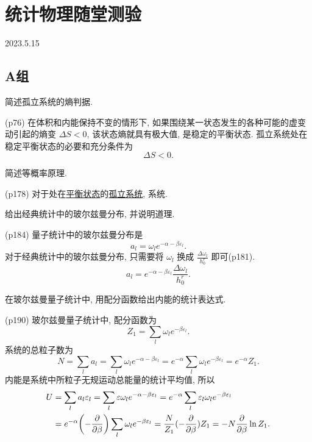 \section{统计物理随堂测验}
2023.5.15
\subsection{A组}
\begin{questions}
  \qt 简述孤立系统的熵判据.
  \begin{solution}
    (p76) 在体积和内能保持不变的情形下, 如果围绕某一状态发生的各种可能的虚变动引起的熵变 $\Delta S < 0$, 该状态熵就具有极大值, 是稳定的平衡状态. 孤立系统处在稳定平衡状态的必要和充分条件为
    \begin{equation}
      \Delta S < 0.
    \end{equation}
  \end{solution}
  \qt 简述等概率原理.
  \begin{solution}
    (p178) 对于处在\uline{平衡状态}的\uline{孤立系统}, 系统.
  \end{solution}
  \qt 给出经典统计中的玻尔兹曼分布, 并说明道理.
  \begin{solution}
    (p184) 量子统计中的玻尔兹曼分布是
    \begin{equation}
      a_l = \omega_l e^{-\alpha-\beta\varepsilon_l}.
    \end{equation}
    对于经典统计中的玻尔兹曼分布, 只需要将 $\omega_l$ 换成 $\frac{\Delta \omega_l}{h_0^r}$ 即可(p181).
    \begin{equation}
      a_l = e^{-\alpha-\beta\varepsilon_l} \frac{\Delta \omega_l}{h_0^r}.
    \end{equation}
  \end{solution}
  \qt 在玻尔兹曼量子统计中, 用配分函数给出内能的统计表达式.
  \begin{solution}
    (p190) 玻尔兹曼量子统计中, 配分函数为
    \begin{equation}
      Z_1 = \sum_l \omega_l e^{-\beta \varepsilon_l}.
    \end{equation}
    系统的总粒子数为
    \begin{equation}
      N = \sum_l a_l = \sum_l \omega_l e^{-\alpha-\beta\varepsilon_l} = e^{-\alpha} \sum_l \omega_l e^{-\beta\varepsilon_l} = e^{-\alpha}Z_1.
    \end{equation}
    内能是系统中所粒子无规运动总能量的统计平均值, 所以
    \begin{equation}
      \begin{aligned}
        U & = \sum_l a_l \varepsilon_l = \sum_l\varepsilon\omega_l e^{-\alpha-\beta\varepsilon_l} = e^{-\alpha} \sum_l \varepsilon_l\omega_l e^{-\beta\varepsilon_l} \\
          & = e^{-\alpha} \qty(-\pdv{\beta}) \sum_l \omega_l e^{-\beta\varepsilon_l} = \frac{N}{Z_1}(-\pdv{\beta})Z_1 = -N\pdv{\beta}\ln Z_1.
      \end{aligned}
    \end{equation}
  \end{solution}
\end{questions}

